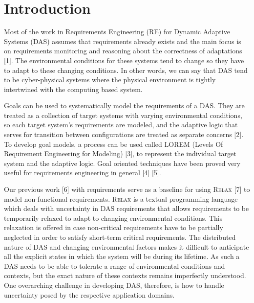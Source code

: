 \documentclass[10pt, conference, compsocconf]{IEEEtran}
\def\myrelax{\textsc{Relax}}                  %
\begin{document}
%
\IEEEpeerreviewmaketitle


\section{Introduction}

Most of the work in Requirements Engineering (RE) for Dynamic Adaptive Systems (DAS) assumes that requirements already exists and the main focus is on requirements monitoring and reasoning about the correctness of adaptations [1]. The environmental conditions for these systems tend to change so they have to adapt to these changing conditions.  In other words, we can say that DAS tend to be cyber-physical systems where the physical environment is tightly intertwined with the computing based system. 

Goals can be used to systematically model the requirements of a DAS. They are treated as a collection of target systems with varying environmental conditions, so each target system's requirements are modeled, and the adaptive logic that serves for transition between configurations are treated as separate concerns [2]. To develop goal models, a process can be used called LOREM (Levels Of Requirement Engineering for Modeling) [3], to represent the individual target system and the adaptive logic. Goal oriented techniques have been proved very useful for requirements engineering in general [4] [5]. 


Our previous work [6] with requirements serve as a baseline for using \myrelax{} [7] to model non-functional requirements. \myrelax{} is a textual programming language which deals with uncertainty in DAS requirements that allows requirements to be temporarily relaxed to adapt to changing environmental conditions. This relaxation is offered in case non-critical requirements have to be partially neglected in order to satisfy short-term critical requirements. The distributed nature of DAS and changing environmental factors makes it difficult to anticipate all the explicit states in which the system will be during its lifetime. As such a DAS needs to be able to tolerate a range of environmental conditions and contexts, but the exact nature of these contexts remains imperfectly understood. One overarching challenge in developing DAS, therefore, is how to handle uncertainty posed by the respective application domains. 
\end{document}
